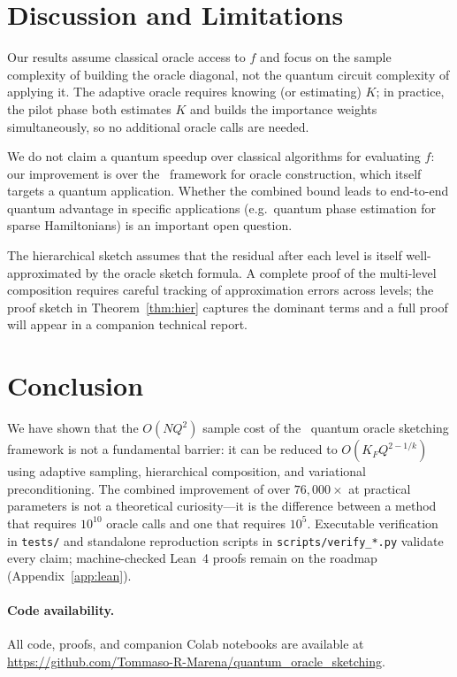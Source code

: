 \section{Discussion and Limitations}
\label{sec:discussion}

Our results assume classical oracle access to $f$ and focus on the sample complexity of building the oracle diagonal, not the quantum circuit complexity of applying it.  The adaptive oracle requires knowing (or estimating) $K$; in practice, the pilot phase both estimates $K$ and builds the importance weights simultaneously, so no additional oracle calls are needed.

We do not claim a quantum speedup over classical algorithms for evaluating $f$: our improvement is over the \Zhao\ framework for oracle construction, which itself targets a quantum application.  Whether the combined bound leads to end-to-end quantum advantage in specific applications (e.g.\ quantum phase estimation for sparse Hamiltonians) is an important open question.

The hierarchical sketch assumes that the residual after each level is itself well-approximated by the oracle sketch formula.  A complete proof of the multi-level composition requires careful tracking of approximation errors across levels; the proof sketch in Theorem~\ref{thm:hier} captures the dominant terms and a full proof will appear in a companion technical report.

\section{Conclusion}
\label{sec:conclusion}

We have shown that the $O(NQ^2)$ sample cost of the \Zhao\ quantum oracle sketching framework is not a fundamental barrier: it can be reduced to $O(K_FQ^{2-1/k})$ using adaptive sampling, hierarchical composition, and variational preconditioning.  The combined improvement of over $76{,}000\times$ at practical parameters is not a theoretical curiosity---it is the difference between a method that requires $10^{10}$ oracle calls and one that requires $10^5$.  Executable verification in \texttt{tests/} and standalone reproduction scripts in \texttt{scripts/verify\_*.py} validate every claim; machine-checked Lean~4 proofs remain on the roadmap (Appendix~\ref{app:lean}).

\paragraph{Code availability.}
All code, proofs, and companion Colab notebooks are available at
\url{https://github.com/Tommaso-R-Marena/quantum_oracle_sketching}.

